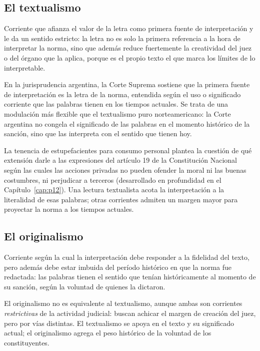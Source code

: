 \documentclass[12pt,oneside]{book}
\begin{document}
\subsection{El textualismo}

\begin{defbox}[: Textualismo]
Corriente que afianza el valor de la letra como primera fuente de interpretación y
le da un sentido estricto: la letra no es solo la primera referencia a la hora de
interpretar la norma, sino que además reduce fuertemente la creatividad del juez o
del órgano que la aplica, porque es el propio texto el que marca los límites de lo
interpretable.
\end{defbox}

En la jurisprudencia argentina, la Corte Suprema sostiene que la primera fuente de
interpretación es la letra de la norma, entendida según el uso o significado
corriente que las palabras tienen en los tiempos actuales. Se trata de una
modulación más flexible que el textualismo puro norteamericano: la Corte argentina
no congela el significado de las palabras en el momento histórico de la sanción,
sino que las interpreta con el sentido que tienen hoy.

\begin{exbox}
La tenencia de estupefacientes para consumo personal plantea la cuestión de qué
extensión darle a las expresiones del artículo 19 de la Constitución Nacional
según las cuales las acciones privadas no pueden ofender la moral ni las buenas
costumbres, ni perjudicar a terceros (desarrollado en profundidad en el
Capítulo~\ref{cap:p12}). Una lectura textualista acota la interpretación a la
literalidad de esas palabras; otras corrientes admiten un margen mayor para
proyectar la norma a los tiempos actuales.
\end{exbox}

\subsection{El originalismo}

\begin{defbox}[: Originalismo]
Corriente según la cual la interpretación debe responder a la fidelidad del texto,
pero además debe estar imbuida del período histórico en que la norma fue redactada:
las palabras tienen el sentido que tenían históricamente al momento de su sanción,
según la voluntad de quienes la dictaron.
\end{defbox}

El originalismo no es equivalente al textualismo, aunque ambas son corrientes
\textit{restrictivas} de la actividad judicial: buscan achicar el margen de
creación del juez, pero por vías distintas. El textualismo se apoya en el texto y
su significado actual; el originalismo agrega el peso histórico de la voluntad de
los constituyentes.
\end{document}
